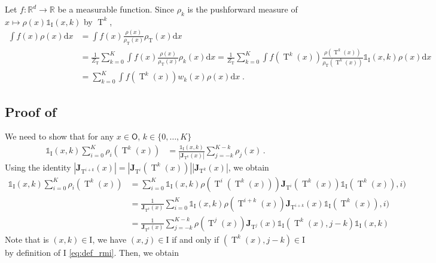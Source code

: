 \documentclass{article}
\def\transfo{\operatorname{T}}
\def\rmd{\operatorname{d}\hspace{-2pt}}
\def\rset{\mathbb{R}}
\def\rmd{\mathrm{d}}
\def\eqsp{\,}
\def\eqsp{\;}
\newcommand{\1}{\mathds{1}}
\newcommand{\indi}[1]{\1_{#1}}
\def\w{w}
\def\proposal{\rho}
\def\Jac{\mathbf{J}}
\newcommand{\JacOp}[1]{\Jac_{#1}}
\def\rmi{\mathrm{I}}
\def\const{Z}
\def\mso{\mathsf{O}}
\def\rset{\mathbb{R}}
\def\zset{\mathbb{Z}}
\def\rmd{\mathrm{d}}
\def\constT{\const_{\transfo}}
\begin{document}
Let $f:\rset^d \to \rset$ be a  measurable  function.  
Since $\rho_k$ is the pushforward measure of $x\mapsto\rho(x)\indi{\rmi}(x,k)$ by $\transfo^{k}$,
\begin{align*}
\int f(x) \proposal(x) \rmd x
&= \int f(x) \frac{\proposal(x)}{\proposal_{\transfo}(x)} \proposal_{\transfo}(x) \rmd x \\
&= \frac{1}{\constT} \sum_{k=0}^K \int f(x) \frac{\proposal(x)}{\proposal_{\transfo}(x)} \proposal_k(x) \rmd x = 
\frac{1}{\constT} \sum_{k=0}^K \int f(\transfo^k(x)) \frac{\proposal(\transfo^k(x))}{\proposal_{\transfo}(\transfo^k(x))} \indi{\rmi}(x,k) \proposal(x) \rmd x \\
&= \sum_{k=0}^K \int f(\transfo^k(x)) \w_k(x) \proposal(x) \rmd x \eqsp.
\end{align*}

\subsection{Proof of }
We need to show that for any $x \in \mso$, $k\in \{0,\dots, K\}$
\begin{align*}
  \indi{\rmi}(x,k)\sum_{i=0}^K  \rho_i(\transfo^k(x))
 & =  \frac{\indi{\rmi}(x,k)}{|\JacOp{\transfo^{k}}(x)|} \sum_{j=-k}^{K-k}  \rho_j(x)  \,.
\end{align*}
Using the identity $|\JacOp{\transfo^{i+k}}(x)|=|\JacOp{\transfo^{i}}(\transfo^k(x))| |\JacOp{\transfo^{k}}(x)|$, we obtain
\begin{align*}
    \indi{\rmi}(x,k)\sum_{i=0}^K  \rho_i(\transfo^k(x)) &=   \sum_{i=0}^K  \indi{\rmi}(x,k)   \rho(\transfo^{i}(\transfo^k(x))) {\JacOp{\transfo^{i}}(\transfo^k(x))} \1_{\rmi}(\transfo^k(x)),i) \\
 &= \frac{1}{\JacOp{\transfo^{k}}(x)}\sum_{i=0}^K  \indi{\rmi}(x,k) \rho(\transfo^{i+k}(x)) {\JacOp{\transfo^{i+k}}(x)} \1_{\rmi}(\transfo^k(x)),i) \\
 &=  \frac{1}{\JacOp{\transfo^{k}}(x)}\sum_{j=-k}^{K-k}  \rho(\transfo^{j}(x)) {\JacOp{\transfo^{j}}(x)} \1_{\rmi}(\transfo^k(x),j-k)\indi{\rmi}(x,k)
\end{align*}
Note that is $(x,k) \in \rmi$, we have $(x,j)\in \rmi$ if and only if
$(\transfo^k(x),j-k) \in \rmi$ by definition of $\rmi$ \eqref{eq:def_rmi}.
Then, we obtain 
\end{document}
